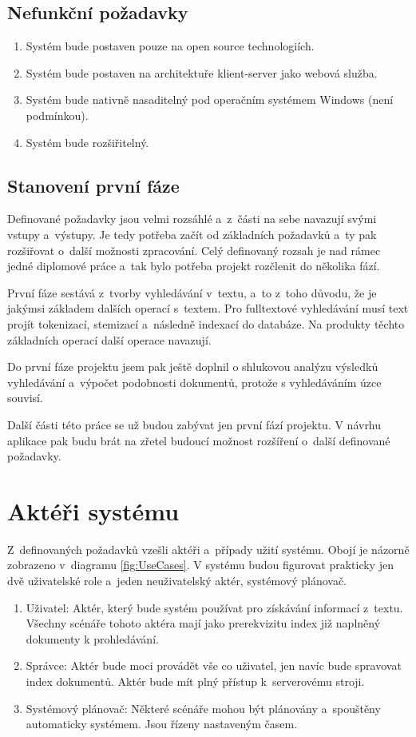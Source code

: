 \subsection{Nefunkční požadavky}
\label{req_1}
\begin{enumerate}
	\item \label{req_10} Systém bude postaven pouze na open source technologiích.
	\item \label{req_11} Systém bude postaven na architektuře klient-server jako webová služba.
	\item \label{req_12} Systém bude nativně nasaditelný pod operačním systémem Windows (není podmínkou).
	\item \label{req_13} Systém bude rozšiřitelný.
\end{enumerate}

\subsection{Stanovení první fáze}
Definované požadavky jsou velmi rozsáhlé a~z~části na sebe navazují svými vstupy a~výstupy. Je tedy potřeba začít od základních požadavků a~ty pak rozšiřovat o~další možnosti zpracování. Celý definovaný rozsah je nad rámec jedné diplomové práce a~tak bylo potřeba projekt rozčlenit do několika fází.

První fáze sestává z~tvorby vyhledávání v~textu, a~to z~toho důvodu, že je jakýmsi základem dalších operací s~textem. Pro fulltextové vyhledávání musí text projít tokenizací, stemizací a~následně indexací do databáze. Na produkty těchto základních operací další operace navazují.

Do první fáze projektu jsem pak ještě doplnil o shlukovou analýzu výsledků vyhledávání a~výpočet podobnosti dokumentů, protože s vyhledáváním úzce souvisí.

Další části této práce se už budou zabývat jen první fází projektu. V návrhu aplikace pak budu brát na zřetel budoucí možnost rozšíření o~další definované požadavky.

\section{Aktéři systému}
Z~definovaných požadavků vzešli aktéři a~případy užití systému. Obojí je názorně zobrazeno v~diagramu \ref{fig:UseCases}. V systému budou figurovat prakticky jen dvě uživatelské role a~jeden neuživatelský aktér, systémový plánovač.

\begin{enumerate}
	\item \label{itm:actor_user}Uživatel: Aktér, který bude systém používat pro získávání informací z~textu. Všechny scénáře tohoto aktéra mají jako prerekvizitu index již naplněný dokumenty k prohledávání.
	\item \label{itm:actor_admin}Správce: Aktér bude moci provádět vše co uživatel, jen navíc bude spravovat index dokumentů. Aktér bude mít plný přístup k~serverovému stroji.
	\item \label{itm:actor_scheduler}Systémový plánovač: Některé scénáře mohou být plánovány a~spouštěny automaticky systémem. Jsou řízeny nastaveným časem.
\end{enumerate}

